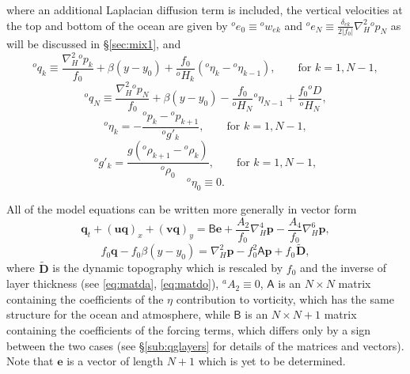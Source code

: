 \documentclass[11pt, a4paper,twoside]{article}
\newcommand{\etb}[2]{{{}^{#1}\eta_{#2}}}
\newcommand{\rhb}[1]{{{}^{#1}\rho}}
\newcommand{\gp}[2]{{}^{#1}g'_{#2}}
\newcommand{\q}[2]{{{}^{#1}q_{#2}}}
\newcommand{\p}[2]{{{}^{#1}p_{#2}}}
\newcommand{\ek}[1]{{{}^{#1}w_{ek}}}
\newcommand{\HH}[2]{{{}^{#1}H_{#2}}}
\newcommand{\at}[1]{{{}^{#1}A_2}}
\newcommand{\ah}[1]{{{}^{#1}A_4}}
\newcommand{\e}[2]{{{}^{#1}e_{#2}}}
\newcommand{\vc}[1]{\mathbf{#1}}
\newcommand{\mtx}[1]{\vc{\mathsf{#1}}}
\newcommand{\D}[1]{{}^{#1}D}
\newcommand{\Dt}[1]{\vc{{}^{#1}\tilde{D}}}
\newcommand{\delek}[0]{\delta_{ek}}
\numberwithin{equation}{section}
\begin{document}
where an additional Laplacian diffusion term is included, the vertical velocities at the top and bottom of the ocean are given by $\e{o}{0} \equiv \ek{o} $ and  $\e{o}{N} \equiv \frac{\delek}{2 \lvert f_0 \rvert} \nabla_H^2\p{o}{N}$ as will be discussed in \S\ref{sec:mix1}, and
\begin{equation}
\q{o}{k} \equiv \frac{\nabla_H^2 \p{o}{k}}{f_0} + \beta(y-y_0) + \frac{ f_0}{\HH{o}{k}}( \etb{o}{k} - \etb{o}{k-1}), \quad \quad \textrm{for } k=1,N-1,
\end{equation}
\begin{equation}
\q{o}{N} \equiv \frac{\nabla_H^2 \p{o}{N}}{f_0} + \beta(y-y_0) - \frac{ f_0}{\HH{o}{N}} \etb{o}{N-1} + \frac{f_0 \D{o}}{\HH{o}{N}},
\end{equation}
\begin{equation}\label{eq:etbk}
\etb{o}{k} =  - \frac{\p{o}{k}-\p{o}{k+1}}{\gp{o}{k}}, \quad \quad \textrm{for } k=1,N-1,
\end{equation}
\[\gp{o}{k} = \frac{g(\rhb{o}_{k+1} - \rhb{o}_{k})}{\rhb{o}_0},\quad \quad \textrm{for } k=1,N-1,\]
\[\etb{o}{0} \equiv 0.\]

All of the model equations can be written more generally in vector form
\begin{equation}\label{eq:matr1}
\vc{q}_t  + (\vc{u} \vc{q})_x  + (\vc{v} \vc{q})_y = \mtx{B}\vc{e}   +\frac{\at{}}{f_0}\nabla_H^4 \vc{p}- \frac{\ah{}}{f_0}\nabla_H^6 \vc{p},
\end{equation}
\begin{equation}\label{eq:matr2}
f_0 \vc{q} - f_0 \beta(y-y_0)  =  \nabla_H^2 \vc{p}  - f_0^2 \mtx{A}\vc{p} + f_0 \Dt{},
\end{equation}
where $\Dt{}$ is the dynamic topography which is rescaled by $f_0$ and the inverse of layer thickness (see \ref{eq:matda}, \ref{eq:matdo}), $\at{a} \equiv 0$, $\mtx{A}$ is an $N \times N$ matrix containing the coefficients of the $\eta$ contribution to vorticity, which has the same structure for the ocean and atmosphere, while $\mtx{B}$ is an $N \times N+1$ matrix containing the coefficients of the forcing terms, which differs only by a sign between the two cases (see \S\ref{sub:qglayers} for details of the matrices and vectors).
Note that $\vc{e}$ is a vector of length $N+1$ which is yet to be determined.
\end{document}
